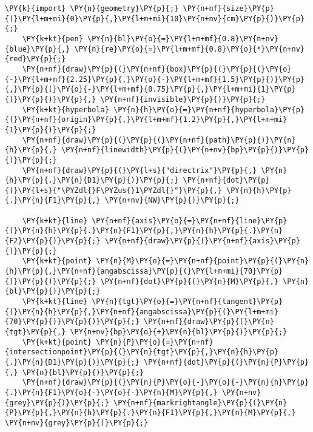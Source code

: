 \begin{Verbatim}[commandchars=\\\{\}]
    \PY{k}{import} \PY{n}{geometry}\PY{p}{;} \PY{n+nf}{size}\PY{p}{(}\PY{l+m+mi}{0}\PY{p}{,}\PY{l+m+mi}{10}\PY{n+nv}{cm}\PY{p}{)}\PY{p}{;}
    \PY{k+kt}{pen} \PY{n}{bl}\PY{o}{=}\PY{l+m+mf}{0.8}\PY{n+nv}{blue}\PY{p}{,} \PY{n}{re}\PY{o}{=}\PY{l+m+mf}{0.8}\PY{o}{*}\PY{n+nv}{red}\PY{p}{;}
    \PY{n+nf}{draw}\PY{p}{(}\PY{n+nf}{box}\PY{p}{(}\PY{p}{(}\PY{o}{-}\PY{l+m+mf}{2.25}\PY{p}{,}\PY{o}{-}\PY{l+m+mf}{1.5}\PY{p}{)}\PY{p}{,}\PY{p}{(}\PY{o}{-}\PY{l+m+mf}{0.75}\PY{p}{,}\PY{l+m+mi}{1}\PY{p}{)}\PY{p}{)}\PY{p}{,} \PY{n+nf}{invisible}\PY{p}{)}\PY{p}{;}
    \PY{k+kt}{hyperbola} \PY{n}{h}\PY{o}{=}\PY{n+nf}{hyperbola}\PY{p}{(}\PY{n+nf}{origin}\PY{p}{,}\PY{l+m+mf}{1.2}\PY{p}{,}\PY{l+m+mi}{1}\PY{p}{)}\PY{p}{;}
    \PY{n+nf}{draw}\PY{p}{(}\PY{p}{(}\PY{n+nf}{path}\PY{p}{)}\PY{n}{h}\PY{p}{,} \PY{n+nf}{linewidth}\PY{p}{(}\PY{n+nv}{bp}\PY{p}{)}\PY{p}{)}\PY{p}{;}
    \PY{n+nf}{draw}\PY{p}{(}\PY{l+s}{"directrix"}\PY{p}{,} \PY{n}{h}\PY{p}{.}\PY{n}{D1}\PY{p}{)}\PY{p}{;} \PY{n+nf}{dot}\PY{p}{(}\PY{l+s}{"\PYZdl{}F\PYZus{}1\PYZdl{}"}\PY{p}{,} \PY{n}{h}\PY{p}{.}\PY{n}{F1}\PY{p}{,} \PY{n+nv}{NW}\PY{p}{)}\PY{p}{;}

    \PY{k+kt}{line} \PY{n+nf}{axis}\PY{o}{=}\PY{n+nf}{line}\PY{p}{(}\PY{n}{h}\PY{p}{.}\PY{n}{F1}\PY{p}{,}\PY{n}{h}\PY{p}{.}\PY{n}{F2}\PY{p}{)}\PY{p}{;} \PY{n+nf}{draw}\PY{p}{(}\PY{n+nf}{axis}\PY{p}{)}\PY{p}{;}
    \PY{k+kt}{point} \PY{n}{M}\PY{o}{=}\PY{n+nf}{point}\PY{p}{(}\PY{n}{h}\PY{p}{,}\PY{n+nf}{angabscissa}\PY{p}{(}\PY{l+m+mi}{70}\PY{p}{)}\PY{p}{)}\PY{p}{;} \PY{n+nf}{dot}\PY{p}{(}\PY{n}{M}\PY{p}{,} \PY{n}{bl}\PY{p}{)}\PY{p}{;}
    \PY{k+kt}{line} \PY{n}{tgt}\PY{o}{=}\PY{n+nf}{tangent}\PY{p}{(}\PY{n}{h}\PY{p}{,}\PY{n+nf}{angabscissa}\PY{p}{(}\PY{l+m+mi}{70}\PY{p}{)}\PY{p}{)}\PY{p}{;} \PY{n+nf}{draw}\PY{p}{(}\PY{n}{tgt}\PY{p}{,} \PY{n+nv}{bp}\PY{o}{+}\PY{n}{bl}\PY{p}{)}\PY{p}{;}
    \PY{k+kt}{point} \PY{n}{P}\PY{o}{=}\PY{n+nf}{intersectionpoint}\PY{p}{(}\PY{n}{tgt}\PY{p}{,}\PY{n}{h}\PY{p}{.}\PY{n}{D1}\PY{p}{)}\PY{p}{;} \PY{n+nf}{dot}\PY{p}{(}\PY{n}{P}\PY{p}{,} \PY{n}{bl}\PY{p}{)}\PY{p}{;}
    \PY{n+nf}{draw}\PY{p}{(}\PY{n}{P}\PY{o}{-}\PY{o}{-}\PY{n}{h}\PY{p}{.}\PY{n}{F1}\PY{o}{-}\PY{o}{-}\PY{n}{M}\PY{p}{,} \PY{n+nv}{grey}\PY{p}{)}\PY{p}{;} \PY{n+nf}{markrightangle}\PY{p}{(}\PY{n}{P}\PY{p}{,}\PY{n}{h}\PY{p}{.}\PY{n}{F1}\PY{p}{,}\PY{n}{M}\PY{p}{,} \PY{n+nv}{grey}\PY{p}{)}\PY{p}{;}


\end{Verbatim}
